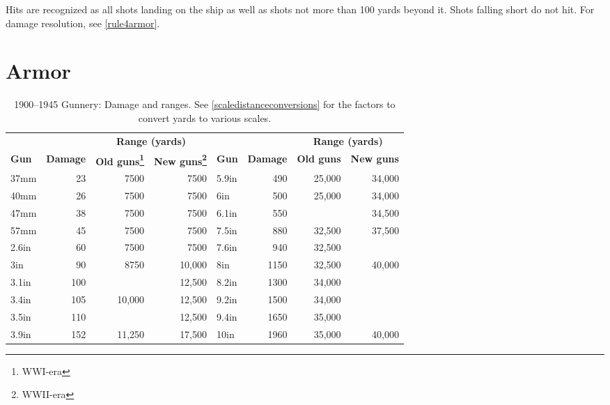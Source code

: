 \documentclass[twocolumn]{article}
\begin{document}
Hits are recognized as all shots landing on the ship as well as shots
not more than 100 yards beyond it. Shots falling short do not hit. For
damage resolution, see \autoref{rule4armor}.

\section{Armor}
\label{rule4armor}

\begin{table*}
  \caption{1900--1945 Gunnery: Damage and ranges. See \autoref{scaledistanceconversions} for the factors to convert yards to various scales.}
  \label{gunnerydamageandranges}
  \centering
  \begin{minipage}{6in}
  \begin{tabular}{lrrr|lrrr}
               &                 & \multicolumn{2}{c}{\textbf{Range (yards)}} &
               &                 & \multicolumn{2}{c}{\textbf{Range (yards)}} \\
  \textbf{Gun} & \textbf{Damage} & \textbf{Old guns\footnote{WWI-era}} & \textbf{New guns\footnote{WWII-era}} &
  \textbf{Gun} & \textbf{Damage} & \textbf{Old guns} & \textbf{New guns} \\
  37mm         &     23 & 7500   & 7500         &  5.9in        &    490 & 25,000    & 34,000       \\
  40mm         &     26 & 7500   & 7500         &  6in          &    500 & 25,000    & 34,000       \\
  47mm         &     38 & 7500   & 7500         &  6.1in        &    550 &           & 34,500       \\
  57mm         &     45 & 7500   & 7500         &  7.5in        &    880 & 32,500    & 37,500       \\
  2.6in        &     60 & 7500   & 7500         &  7.6in        &    940 & 32,500    &              \\
  3in          &     90 & 8750   & 10,000       &  8in          &   1150 & 32,500    & 40,000       \\
  3.1in        &    100 &        & 12,500       &  8.2in        &   1300 & 34,000    &              \\
  3.4in        &    105 & 10,000 & 12,500       &  9.2in        &   1500 & 34,000    &              \\
  3.5in        &    110 &        & 12,500       &  9.4in        &   1650 & 35,000    &              \\
  3.9in        &    152 & 11,250 & 17,500       &  10in         &   1960 & 35,000    & 40,000       \\

\end{tabular}
\end{minipage}
\end{table*}
\end{document}

